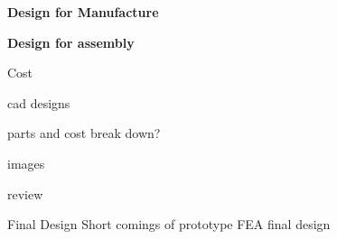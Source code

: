 \textbf{Design for Manufacture}

\textbf{Design for assembly}

Cost



cad designs

parts and cost break down?

images

review


Final Design
Short comings of prototype FEA
final design

